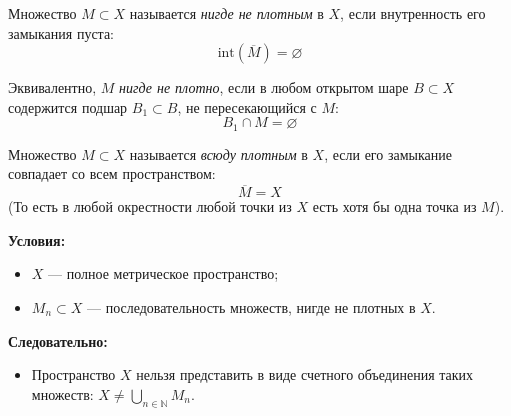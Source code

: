 \begin{definition}
	Множество $M \subset X$ называется \textit{нигде не плотным} в $X$, если внутренность его замыкания пуста:
	\[ \text{int}(\overline{M}) = \varnothing \]
\end{definition}

\begin{definition}
	Эквивалентно, $M$ \textit{нигде не плотно}, если в любом открытом шаре $B \subset X$ содержится подшар $B_1 \subset B$, не пересекающийся с $M$:
	\[ B_1 \cap M = \varnothing \]
\end{definition}

\begin{definition}
	Множество $M \subset X$ называется \textit{всюду плотным} в $X$, если его замыкание совпадает со всем пространством:
	\[ \overline{M} = X \]
	(То есть в любой окрестности любой точки из $X$ есть хотя бы одна точка из $M$).
\end{definition}

\begin{theorem}[Бэра]\label{Ber}
	\textbf{Условия:}
	\begin{itemize}
		\item $X$ --- полное метрическое пространство;
		\item $M_n \subset X$ --- последовательность множеств, нигде не плотных в $X$.
	\end{itemize}
	\textbf{Следовательно:}
	\begin{itemize}
		\item Пространство $X$ нельзя представить в виде счетного объединения таких множеств: $X \neq \bigcup\limits_{n \in \mathbb{N}} M_n$.
	\end{itemize}
\end{theorem}

